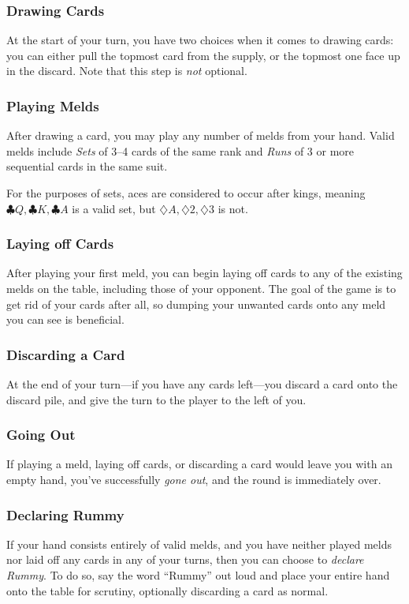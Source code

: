 \subsubsection{Drawing Cards}
At the start of your turn, you have two choices when it comes to drawing cards: you can either pull the topmost card from the supply, or the topmost one face up in the discard.
Note that this step is \textit{not} optional.
\subsubsection{Playing Melds}
After drawing a card, you may play any number of melds from your hand. Valid melds include \textit{Sets} of 3--4 cards of the same rank and \textit{Runs} of 3 or more sequential cards in the same suit.

For the purposes of sets, aces are considered to occur after kings, meaning $\clubsuit Q, \clubsuit K, \clubsuit A$ is a valid set, but $\diamondsuit A, \diamondsuit 2, \diamondsuit 3$ is not.
\subsubsection{Laying off Cards}
After playing your first meld, you can begin laying off cards to any of the existing melds on the table, including those of your opponent.
The goal of the game is to get rid of your cards after all, so dumping your unwanted cards onto any meld you can see is beneficial.
\subsubsection{Discarding a Card}
At the end of your turn---if you have any cards left---you discard a card onto the discard pile, and give the turn to the player to the left of you.
\subsubsection{Going Out}
If playing a meld, laying off cards, or discarding a card would leave you with an empty hand, you've successfully \textit{gone out}, and the round is immediately over.

\subsubsection{Declaring Rummy}
If your hand consists entirely of valid melds, and you have neither played melds nor laid off any cards in any of your turns, then you can choose to \textit{declare Rummy}. To do so, say the word ``Rummy'' out loud and place your entire hand onto the table for scrutiny, optionally discarding a card as normal.


